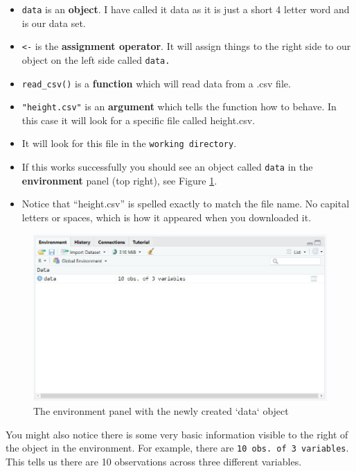 \documentclass[
]{book}
\begin{document}
\begin{itemize}
\item
  \texttt{data} is an \textbf{object}. I have called it data as it is just a short 4 letter word and is our data set.
\item
  \texttt{\textless{}-} is the \textbf{assignment operator}. It will assign things to the right side to our object on the left side called \texttt{data.}
\item
  \texttt{read\_csv()} is a \textbf{function} which will read data from a .csv file.
\item
  \texttt{"height.csv"} is an \textbf{argument} which tells the function how to behave. In this case it will look for a specific file called height.csv.
\item
  It will look for this file in the \texttt{working\ directory}.
\item
  If this works successfully you should see an object called \texttt{data} in the \textbf{environment} panel (top right), see Figure \ref{fig:fig-environment-6}.
\item
  Notice that ``height.csv'' is spelled exactly to match the file name. No capital letters or spaces, which is how it appeared when you downloaded it.
\end{itemize}

\begin{figure}[H]

{\centering \includegraphics[width=0.75\linewidth]{images/importdata} 

}

\caption{The environment panel with the newly created `data` object}\label{fig:fig-environment-6}
\end{figure}

You might also notice there is some very basic information visible to the right of the object in the environment. For example, there are \texttt{10\ obs.\ of\ 3\ variables}. This tells us there are 10 observations across three different variables.
\end{document}
